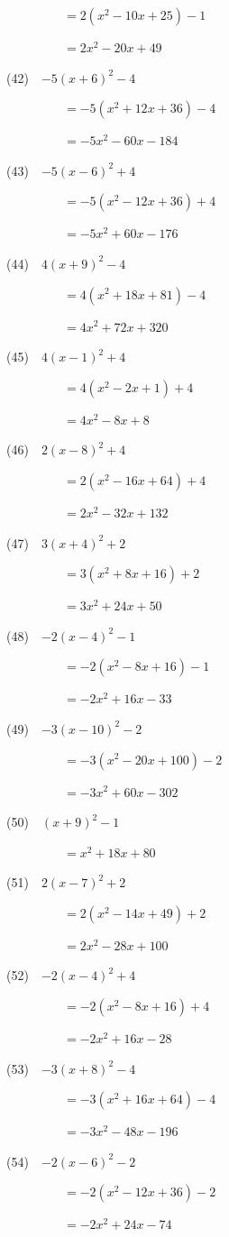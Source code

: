 \documentclass[a4j,twocolumn,10pt,fleqn]{jarticle}
\begin{document}
~~~~~~~~~$=2(x^2-10x +25)-1$

~~~~~~~~~$=2x^2-20x +49$

(42)~~$-5(x +6)^2-4$

~~~~~~~~~$=-5(x^2 +12x +36)-4$

~~~~~~~~~$=-5x^2-60x-184$

(43)~~$-5(x-6)^2 +4$

~~~~~~~~~$=-5(x^2-12x +36) +4$

~~~~~~~~~$=-5x^2 +60x-176$

(44)~~$4(x +9)^2-4$

~~~~~~~~~$=4(x^2 +18x +81)-4$

~~~~~~~~~$=4x^2 +72x +320$

(45)~~$4(x-1)^2 +4$

~~~~~~~~~$=4(x^2-2x +1) +4$

~~~~~~~~~$=4x^2-8x +8$

(46)~~$2(x-8)^2 +4$

~~~~~~~~~$=2(x^2-16x +64) +4$

~~~~~~~~~$=2x^2-32x +132$

(47)~~$3(x +4)^2 +2$

~~~~~~~~~$=3(x^2 +8x +16) +2$

~~~~~~~~~$=3x^2 +24x +50$

(48)~~$-2(x-4)^2-1$

~~~~~~~~~$=-2(x^2-8x +16)-1$

~~~~~~~~~$=-2x^2 +16x-33$

(49)~~$-3(x-10)^2-2$

~~~~~~~~~$=-3(x^2-20x +100)-2$

~~~~~~~~~$=-3x^2 +60x-302$

(50)~~$(x +9)^2-1$

~~~~~~~~~$=x^2 +18x +80$

(51)~~$2(x-7)^2 +2$

~~~~~~~~~$=2(x^2-14x +49) +2$

~~~~~~~~~$=2x^2-28x +100$

(52)~~$-2(x-4)^2 +4$

~~~~~~~~~$=-2(x^2-8x +16) +4$

~~~~~~~~~$=-2x^2 +16x-28$

(53)~~$-3(x +8)^2-4$

~~~~~~~~~$=-3(x^2 +16x +64)-4$

~~~~~~~~~$=-3x^2-48x-196$

(54)~~$-2(x-6)^2-2$

~~~~~~~~~$=-2(x^2-12x +36)-2$

~~~~~~~~~$=-2x^2 +24x-74$
\end{document}
